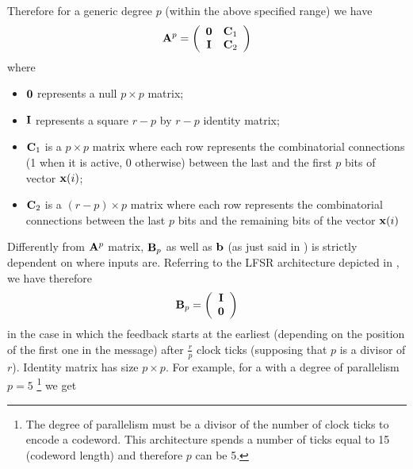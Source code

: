 Therefore for a generic degree $p$ (within the above specified range) we have
\begin{equation} \label{eq:Apreg}
\mathbf{A}^p =
\left(
\begin{array}{cc}
\mathbf{0} & \mathbf{C}_1 \\
\mathbf{I} & \mathbf{C}_2
\end{array}
\right)
\end{equation}
where
\begin{itemize}
\item \(\mathbf{0}\) represents a null \(p \times p\) matrix;
\item $\mathbf{I}$ represents a square $r-p$ by $r-p$ identity matrix;
\item $\mathbf{C}_1$ is a $p \times p$ matrix where each row represents the combinatorial connections (1 when it is active, 0 otherwise) between the last and the first $p$ bits of vector $\mathbf{x}(i)$;
\item $\mathbf{C}_2$ is a $(r-p) \times p$ matrix where each row represents the combinatorial connections between the last $p$ bits and the remaining bits of the vector \(\mathbf{x}(i)\)
\end{itemize}

Differently from $\mathbf{A}^p$ matrix, $\mathbf{B}_p$ as well as $\mathbf{b}$ (as just said in ) is strictly dependent on where inputs are. Referring to the LFSR architecture depicted in , we have therefore
\begin{equation} \label{eq:Btrivial}
\mathbf{B}_p =
\left(
\begin{array}{c}
\mathbf{I} \\
\mathbf{0}
\end{array}
\right)
\end{equation}
in the case in which the feedback starts at the earliest (depending on the position of the first one in the message) after $\frac{r}{p}$ clock ticks (supposing that \(p\) is a divisor of \(r\)). Identity matrix has size $p\times p$. For example, for a  with a degree of parallelism $p=5$
\footnote{The degree of parallelism must be a divisor of the number of clock ticks to encode a codeword. This architecture spends a number of ticks equal to 15 (codeword length) and therefore \(p\) can be 5.}
we get


